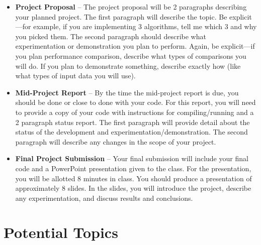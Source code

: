 \documentclass[a4paper,12pt]{article}
\begin{document}
\begin{itemize}
    \item \textbf{Project Proposal} -- The project proposal will be 2 paragraphs describing your planned project. The first paragraph will describe the topic. Be explicit---for example, if you are implementing 3 algorithms, tell me which 3 and why you picked them. The second paragraph should describe what experimentation or demonstration you plan to perform. Again, be explicit---if you plan performance comparison, describe what types of comparisons you will do. If you plan to demonstrate something, describe exactly how (like what types of input data you will use). 
    
    \item \textbf{Mid-Project Report} -- By the time the mid-project report is due, you should be done or close to done with your code. For this report, you will need to provide a copy of your code with instructions for compiling/running and a 2 paragraph status report. The first paragraph will provide detail about the status of the development and experimentation/demonstration. The second paragraph will describe any changes in the scope of your project.
    
    \item \textbf{Final Project Submission} -- Your final submission will include your final code and a PowerPoint presentation given to the class. For the presentation, you will be allotted 8 minutes in class. You should produce a presentation of approximately 8 slides. In the slides, you will introduce the project, describe any experimentation, and discuss results and conclusions. 
        
\end{itemize}


\section{Potential Topics}

\end{document}
